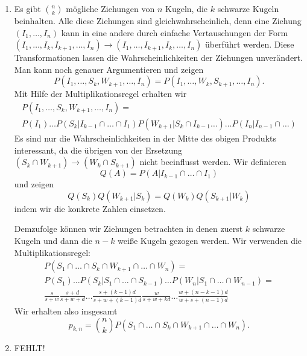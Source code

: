 \solution
\begin{enumerate}
    \item Es gibt $\binom{n}{k}$ mögliche Ziehungen von $n$ Kugeln, die $k$
        schwarze Kugeln beinhalten. Alle diese Ziehungen sind
        gleichwahrscheinlich, denn eine Ziehung $(I_1, \dots, I_n)$ kann in
        eine andere durch einfache Vertauschungen der Form $(I_1, \dots,
        I_{k}, I_{k+1}, \dots, I_n) \to \left( I_1, \dots, I_{k+1}, I_{k},
        \dots, I_n \right)$ überführt werden. Diese Transformationen lassen
        die Wahrscheinlichkeiten der Ziehungen unverändert. Man kann noch 
        genauer Argumentieren und zeigen
        \begin{equation*}
            P( I_1, \dots, S_k, W_{k+1}, \dots, I_n) = 
            P( I_1, \dots, W_{k}, S_{k+1}, \dots, I_n).
        \end{equation*}
        Mit Hilfe der Multiplikationsregel erhalten wir
        \begin{align*}
            P( I_1, \dots, S_k, W_{k+1}, \dots, I_n) = \\
            P(I_1)\dots P(S_k | I_{k-1}\cap\dots\cap I_1) 
            P( W_{k+1} | S_k\cap I_{k-1}\dots) \dots P(I_n | I_{n-1}\cap \dots)
        \end{align*}
        Es sind nur die Wahrscheinlichkeiten in der Mitte des obigen Produkts
        interessant, da die übrigen von der Ersetzung $(S_k\cap W_{k+1} ) \to
        (W_k \cap S_{k+1})$ nicht beeinflusst werden. Wir definieren 
        \begin{equation*}
            Q(A) = P(A | I_{k-1} \cap \dots\cap I_1)
        \end{equation*}
        und zeigen
        \begin{equation*}
            Q( S_k ) Q(W_{k+1} | S_k) = Q(W_k) Q( S_{k+1} | W_k)
        \end{equation*}
        indem wir die konkrete Zahlen einsetzen.

        Demzufolge können wir Ziehungen betrachten in denen zuerst $k$
        schwarze Kugeln und dann die $n-k$ weiße Kugeln gezogen werden.
        Wir verwenden die Multiplikationsregel:
        \begin{align*}
            P( S_1 \cap \dots \cap S_k \cap W_{k+1} \cap \dots \cap W_{n} ) = \\
            P(S_1) \dots P(S_k | S_1\cap\dots\cap S_{k-1})\dots
            P(W_{n} | S_1\cap \dots\cap W_{n-1} ) = \\
            \frac{s}{s+w} \frac{s+d}{s+w+d}\dots\frac{s+(k-1)d}{s+w+(k-1)d}
            \frac{w}{s+w+ kd}\dots\frac{w + (n-k-1)d}{ w+s+(n-1)d}
        \end{align*}
        Wir erhalten also insgesamt
        \begin{equation*}
            p_{k,n} = \binom{n}{k} P( S_1 \cap \dots \cap S_k \cap W_{k+1} \cap \dots \cap W_{n} ).
        \end{equation*}

    \item FEHLT!
\end{enumerate}


